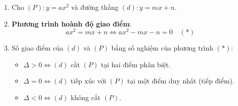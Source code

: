 \begin{enumerate}
\item Cho $(P)\colon y = ax^2$ và đường thẳng $(d)\colon y = mx + n$.
\item \textbf{Phương trình hoành độ giao điểm}:
$$\boxed{ax^2 = mx + n \iff ax^2 - mx - n = 0 \quad (*)}$$
\item Số giao điểm của $(d)$ và $(P)$ bằng số nghiệm của phương trình $(*)$:
\begin{itemize}
\item $\Delta > 0 \iff (d)$ cắt $(P)$ tại hai điểm phân biệt.
\item $\Delta = 0 \iff (d)$ tiếp xúc với $(P)$ tại một điểm duy nhất (tiếp điểm).
\item $\Delta < 0 \iff (d)$ không cắt $(P)$.
\end{itemize}
\end{enumerate}
